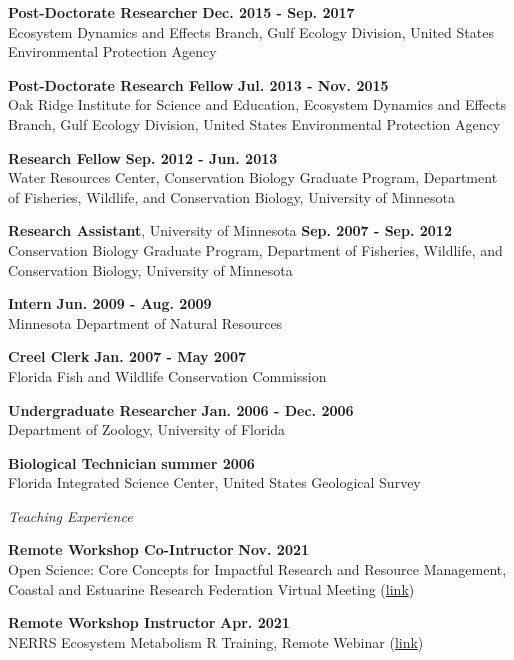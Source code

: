 \documentclass[letterpaper,12pt]{article}
\newcommand{\sectitle}[1]{\vspace{\baselineskip} \centerline{\large{\textit{#1}}}}
\begin{document}
{\bf Post-Doctorate Researcher} \hfill {\bf Dec. 2015 - Sep. 2017}\\
Ecosystem Dynamics and Effects Branch, Gulf Ecology Division, United States Environmental Protection Agency

{\bf Post-Doctorate Research Fellow} \hfill {\bf Jul. 2013 - Nov. 2015}\\
Oak Ridge Institute for Science and Education, Ecosystem Dynamics and Effects Branch, Gulf Ecology Division, United States Environmental Protection Agency

{\bf Research Fellow} \hfill {\bf Sep. 2012 - Jun. 2013} \\
Water Resources Center, Conservation Biology Graduate Program, Department of Fisheries, Wildlife, and Conservation Biology, University of Minnesota

{\bf Research Assistant}, University of Minnesota \hfill {\bf Sep. 2007 - Sep. 2012} \\
Conservation Biology Graduate Program, Department of Fisheries, Wildlife, and Conservation Biology, University of Minnesota

{\bf Intern} \hfill {\bf Jun. 2009 - Aug. 2009} \\
Minnesota Department of Natural Resources

{\bf Creel Clerk} \hfill {\bf Jan. 2007 - May 2007} \\
Florida Fish and Wildlife Conservation Commission

{\bf Undergraduate Researcher} \hfill {\bf Jan. 2006 - Dec. 2006} \\
Department of Zoology, University of Florida

{\bf Biological Technician} \hfill {\bf summer 2006} \\
Florida Integrated Science Center, United States Geological Survey

\sectitle{Teaching Experience}

{\bf Remote Workshop Co-Intructor} \hfill {\bf Nov. 2021}\\
Open Science: Core Concepts for Impactful Research and Resource Management, Coastal and Estuarine Research Federation Virtual Meeting ({\footnotesize\href{https://tbep-tech.github.io/cerf-os-workshop/}{link}})

{\bf Remote Workshop Instructor} \hfill {\bf Apr. 2021}\\
NERRS Ecosystem Metabolism R Training, Remote Webinar ({\footnotesize\href{https://tbep-tech.github.io/ecometab-r-training/}{link}})
\end{document}
